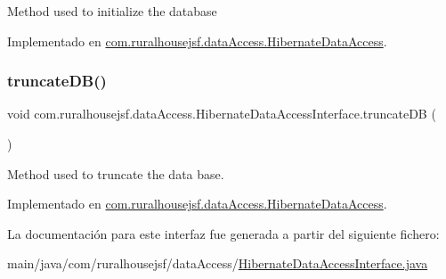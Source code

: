Method used to initialize the database 

Implementado en \mbox{\hyperlink{classcom_1_1ruralhousejsf_1_1data_access_1_1_hibernate_data_access_af6f8016d5e185e86519871913781fe73}{com.\+ruralhousejsf.\+data\+Access.\+Hibernate\+Data\+Access}}.

\mbox{\label{interfacecom_1_1ruralhousejsf_1_1data_access_1_1_hibernate_data_access_interface_a181eb91e600e57fe36301128022f535d}} 
\subsubsection{\texorpdfstring{truncateDB()}{truncateDB()}}
{\footnotesize\ttfamily void com.\+ruralhousejsf.\+data\+Access.\+Hibernate\+Data\+Access\+Interface.\+truncate\+DB (\begin{DoxyParamCaption}{ }\end{DoxyParamCaption})}

Method used to truncate the data base. 

Implementado en \mbox{\hyperlink{classcom_1_1ruralhousejsf_1_1data_access_1_1_hibernate_data_access_a81a5e60db58acfc1a3c1de2f014813d5}{com.\+ruralhousejsf.\+data\+Access.\+Hibernate\+Data\+Access}}.



La documentación para este interfaz fue generada a partir del siguiente fichero\+:\begin{DoxyCompactItemize}
\item 
main/java/com/ruralhousejsf/data\+Access/\mbox{\hyperlink{_hibernate_data_access_interface_8java}{Hibernate\+Data\+Access\+Interface.\+java}}\end{DoxyCompactItemize}
